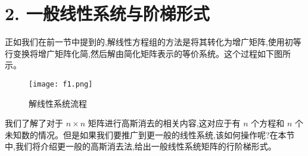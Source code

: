 \newcommand{\circlednum}[1]{%
    \tikz[baseline=(char.base)]{%
        \node[draw, circle, inner sep=1pt] (char) {#1};%
    }%
}

\section*{2. 一般线性系统与阶梯形式}
正如我们在前一节中提到的,解线性方程组的方法是将其转化为增广矩阵,使用初等行变换将增广矩阵化简,然后解由简化矩阵表示的等价系统。这个过程如下图所示。

\begin{figure}[h]
    \centering
    \texttt{[image: f1.png]} %
    \caption{解线性系统流程}
    \label{fig:linear_system_process}
\end{figure}

我们了解了对于 \(n \times n\) 矩阵进行高斯消去的相关内容,这对应于有 \(n\) 个方程和 \(n\) 个未知数的情况。但是如果我们要推广到更一般的线性系统,该如何操作呢?在本节中,我们将介绍更一般的高斯消去法,给出一般线性系统矩阵的行阶梯形式。


